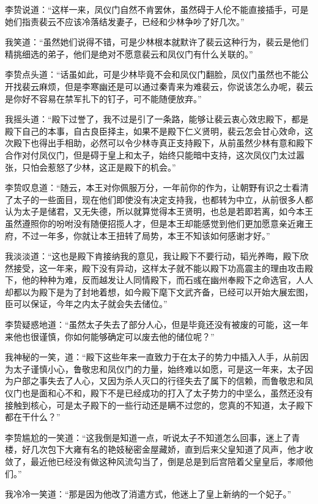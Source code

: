 李贽说道：“这样一来，凤仪门自然不肯罢休，虽然碍于人伦不能直接插手，可是她们指责裴云不应该冷落结发妻子，已经和少林争吵了好几次。”

我笑道：“虽然她们说得不错，可是少林根本就默许了裴云这种行为，裴云是他们精挑细选的弟子，他们是绝对不愿意裴云和凤仪门有什么关联的。”

李贽点头道：“话虽如此，可是少林毕竟不会和凤仪门翻脸，凤仪门虽然也不能公开找裴云麻烦，但是李寒幽还是可以通过秦青来为难裴云，你说该怎么办呢，裴云是你好不容易在禁军扎下的钉子，可不能随便放弃。”

我摇头道：“殿下过誉了，我不过是引了一条路，能够让裴云衷心效忠殿下，都是殿下自己的本事，自古良臣择主，如果不是殿下仁义贤明，裴云怎会甘心效命，这次殿下也得出手相助，必然可以令少林寺真正支持殿下，从前虽然少林有意和殿下合作对付凤仪门，但是碍于皇上和太子，始终只能暗中支持，这次凤仪门太过嚣张，只怕会惹怒了少林，这正是殿下的机会。”

李贽叹息道：“随云，本王对你佩服万分，一年前你的作为，让朝野有识之士看清了太子的一些面目，现在他们即使没有决定支持我，也都转为中立，从前很多人都认为太子是储君，又无失德，所以就算觉得本王贤明，也总是若即若离，如今本王虽然遵照你的吩咐没有随便招揽人才，但是本王却能感觉到他们更加愿意亲近雍王府，不过一年多，你就让本王扭转了局势，本王不知该如何感谢才好。”

我淡淡道：“这也是殿下肯接纳我的意见，我让殿下不要行动，韬光养晦，殿下欣然接受，这一年来，殿下没有异动，这样太子就不能以殿下功高震主的理由攻击殿下，他的种种为难，反而越发让人同情殿下，而石彧在幽州奉殿下之命选官，人人却都以为殿下是为了封地着想，如今殿下麾下文武齐备，已经可以开始大展宏图，臣可以保证，今年之内太子就会失去储位。”

李贽疑惑地道：“虽然太子失去了部分人心，但是毕竟还没有被废的可能，这一年来他也很谨慎，你如何能够确定可以废去他的储位呢？”

我神秘的一笑，道：“殿下这些年来一直致力于在太子的势力中插入人手，从前因为太子谨慎小心，鲁敬忠和凤仪门的力量，始终难以如愿，可是这一年来，太子因为户部之事失去了人心，又因为杀人灭口的行径失去了属下的信赖，而鲁敬忠和凤仪门也是面和心不和，殿下不是已经成功的打入了太子势力的中坚么，虽然还没有接触到核心，可是太子殿下的一些行动还是瞒不过您的，您真的不知道，太子殿下都在干什么？”

李贽尴尬的一笑道：“这我倒是知道一点，听说太子不知道怎么回事，迷上了青楼，好几次包下大雍有名的艳妓秘密金屋藏娇，直到后来父皇知道了风声，他才收敛了，最近他已经没有做这种风流勾当了，倒是总是到后宫陪着父皇皇后，孝顺他们。”

我冷冷一笑道：“那是因为他改了消遣方式，他迷上了皇上新纳的一个妃子。”

